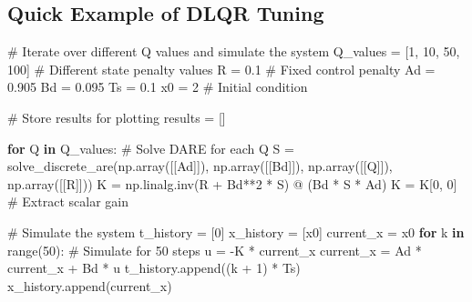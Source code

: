 \documentclass[
  letterpaper,
  DIV=11,
  numbers=noendperiod,
  oneside]{scrartcl}
\newenvironment{Shaded}{\begin{snugshade}}{\end{snugshade}}
\newcommand{\BuiltInTok}[1]{\textcolor[rgb]{0.00,0.23,0.31}{#1}}
\newcommand{\CommentTok}[1]{\textcolor[rgb]{0.37,0.37,0.37}{#1}}
\newcommand{\ControlFlowTok}[1]{\textcolor[rgb]{0.00,0.23,0.31}{\textbf{#1}}}
\newcommand{\DecValTok}[1]{\textcolor[rgb]{0.68,0.00,0.00}{#1}}
\newcommand{\FloatTok}[1]{\textcolor[rgb]{0.68,0.00,0.00}{#1}}
\newcommand{\KeywordTok}[1]{\textcolor[rgb]{0.00,0.23,0.31}{\textbf{#1}}}
\newcommand{\NormalTok}[1]{\textcolor[rgb]{0.00,0.23,0.31}{#1}}
\newcommand{\OperatorTok}[1]{\textcolor[rgb]{0.37,0.37,0.37}{#1}}
\begin{document}
\subsection{Quick Example of DLQR
Tuning}\label{quick-example-of-dlqr-tuning}

\begin{Shaded}
\begin{Highlighting}[numbers=left,,]
\CommentTok{\# Iterate over different Q values and simulate the system}
\NormalTok{Q\_values }\OperatorTok{=}\NormalTok{ [}\DecValTok{1}\NormalTok{, }\DecValTok{10}\NormalTok{, }\DecValTok{50}\NormalTok{, }\DecValTok{100}\NormalTok{]  }\CommentTok{\# Different state penalty values}
\NormalTok{R }\OperatorTok{=} \FloatTok{0.1}  \CommentTok{\# Fixed control penalty}
\NormalTok{Ad }\OperatorTok{=} \FloatTok{0.905}
\NormalTok{Bd }\OperatorTok{=} \FloatTok{0.095}
\NormalTok{Ts }\OperatorTok{=} \FloatTok{0.1}
\NormalTok{x0 }\OperatorTok{=} \DecValTok{2}  \CommentTok{\# Initial condition}

\CommentTok{\# Store results for plotting}
\NormalTok{results }\OperatorTok{=}\NormalTok{ []}

\ControlFlowTok{for}\NormalTok{ Q }\KeywordTok{in}\NormalTok{ Q\_values:}
  \CommentTok{\# Solve DARE for each Q}
\NormalTok{  S }\OperatorTok{=}\NormalTok{ solve\_discrete\_are(np.array([[Ad]]), np.array([[Bd]]), np.array([[Q]]), np.array([[R]]))}
\NormalTok{  K }\OperatorTok{=}\NormalTok{ np.linalg.inv(R }\OperatorTok{+}\NormalTok{ Bd}\OperatorTok{**}\DecValTok{2} \OperatorTok{*}\NormalTok{ S) }\OperatorTok{@}\NormalTok{ (Bd }\OperatorTok{*}\NormalTok{ S }\OperatorTok{*}\NormalTok{ Ad)}
\NormalTok{  K }\OperatorTok{=}\NormalTok{ K[}\DecValTok{0}\NormalTok{, }\DecValTok{0}\NormalTok{]  }\CommentTok{\# Extract scalar gain}

  \CommentTok{\# Simulate the system}
\NormalTok{  t\_history }\OperatorTok{=}\NormalTok{ [}\DecValTok{0}\NormalTok{]}
\NormalTok{  x\_history }\OperatorTok{=}\NormalTok{ [x0]}
\NormalTok{  current\_x }\OperatorTok{=}\NormalTok{ x0}
  \ControlFlowTok{for}\NormalTok{ k }\KeywordTok{in} \BuiltInTok{range}\NormalTok{(}\DecValTok{50}\NormalTok{):  }\CommentTok{\# Simulate for 50 steps}
\NormalTok{    u }\OperatorTok{=} \OperatorTok{{-}}\NormalTok{K }\OperatorTok{*}\NormalTok{ current\_x}
\NormalTok{    current\_x }\OperatorTok{=}\NormalTok{ Ad }\OperatorTok{*}\NormalTok{ current\_x }\OperatorTok{+}\NormalTok{ Bd }\OperatorTok{*}\NormalTok{ u}
\NormalTok{    t\_history.append((k }\OperatorTok{+} \DecValTok{1}\NormalTok{) }\OperatorTok{*}\NormalTok{ Ts)}
\NormalTok{    x\_history.append(current\_x)}


\end{Highlighting}
\end{Shaded}
\end{document}
